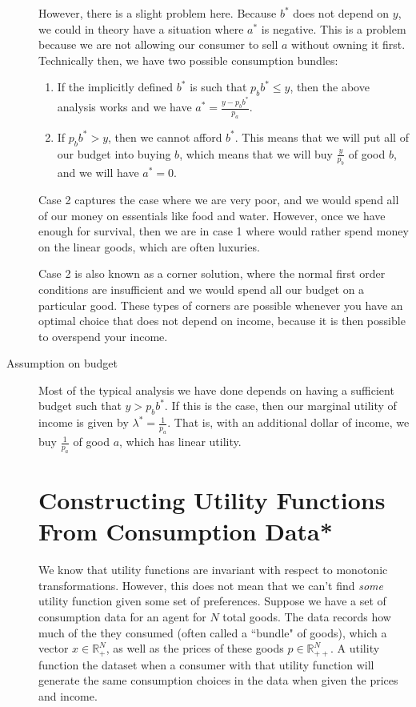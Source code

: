 \begin{description}
    However, there is a slight problem here. Because $b^*$ does not depend on $y$, we could in theory have a situation where $a^*$ is negative. This is a problem because we are not allowing our consumer to sell $a$ without owning it first. Technically then, we have two possible consumption bundles:
    \begin{enumerate}
        \item If the implicitly defined $b^*$ is such that $p_b b^* \leq y$, then the above analysis works and we have $a^* = \frac{y - p_b b^*}{p_a}$.
        \item If $p_b b^* > y$, then we cannot afford $b^*$. This means that we will put all of our budget into buying $b$, which means that we will buy $\frac{y}{p_b}$ of good $b$, and we will have $a^* = 0$.  
   \end{enumerate}
   Case 2 captures the case where we are very poor, and we would spend all of our money on essentials like food and water. However, once we have enough for survival, then we are in case 1 where would rather spend money on the linear goods, which are often luxuries.

   Case 2 is also known as a corner solution, where the normal first order conditions are insufficient and we would spend all our budget on a particular good. These types of corners are possible whenever you have an optimal choice that does not depend on income, because it is then possible to overspend your income. 
   
   \item[Assumption on budget] Most of the typical analysis we have done depends on having a sufficient budget such that $y > p_b b^*$. If this is the case, then our marginal utility of income is given by $\lambda^* = \frac{1}{p_a}$. That is, with an additional dollar of income, we buy $\frac{1}{p_a}$ of good $a$, which has linear utility.

\section{Constructing Utility Functions From Consumption Data*}
We know that utility functions are invariant with respect to monotonic transformations. However, this does not mean that we can't find \emph{some} utility function given some set of preferences. Suppose we have a set of consumption data for an agent for $N$ total goods. The data records how much of the they consumed (often called a ``bundle" of goods), which a vector $x \in \mathbb{R}^N_+$, as well as the prices of these goods $p \in \mathbb{R}^N_{++}$. A utility function  the dataset when a consumer with that utility function will generate the same consumption choices in the data when given the prices and income.


\end{description}
